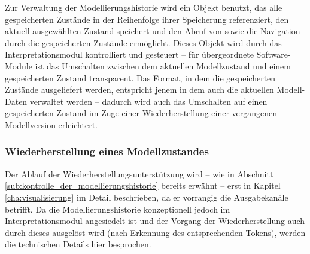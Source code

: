 Zur Verwaltung der Modellierungshistorie wird ein Objekt benutzt, das alle gespeicherten Zustände in der Reihenfolge ihrer Speicherung referenziert, den aktuell ausgewählten Zustand speichert und den Abruf von sowie die Navigation durch die gespeicherten Zustände ermöglicht. Dieses Objekt wird durch das Interpretationsmodul kontrolliert und gesteuert -- für übergeordnete Software-Module ist das Umschalten zwischen dem aktuellen Modellzustand und einem gespeicherten Zustand transparent. Das Format, in dem die gespeicherten Zustände ausgeliefert werden, entspricht jenem in dem auch die aktuellen Modell-Daten verwaltet werden -- dadurch wird auch das Umschalten auf einen gespeicherten Zustand im Zuge einer Wiederherstellung einer vergangenen Modellversion erleichtert.

\subsubsection{Wiederherstellung eines Modellzustandes} %
\label{ssub:wiederherstellung_eines_modellzustandes}

Der Ablauf der Wiederherstellungsunterstützung wird -- wie in Abschnitt \ref{sub:kontrolle_der_modellierungshistorie} bereits erwähnt -- erst in Kapitel \ref{cha:visualisierung} im Detail beschrieben, da er vorrangig die Ausgabekanäle betrifft. Da die Modellierungshistorie konzeptionell jedoch im Interpretationsmodul angesiedelt ist und der Vorgang der Wiederherstellung auch durch dieses ausgelöst wird (nach Erkennung des entsprechenden Tokens), werden die technischen Details hier besprochen. 

